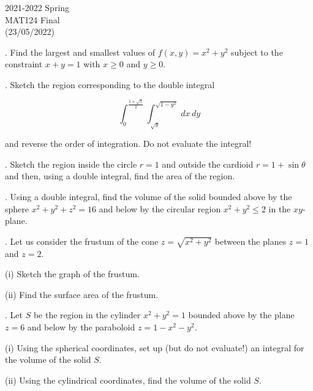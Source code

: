 \documentclass{article}
\begin{document}
\large

\begin{center}
2021-2022 Spring \\MAT124 Final\\(23/05/2022)
\end{center}

. Find the largest and smallest values of $f(x,y) = x^2+y^2$ subject to the constraint $x+y=1$ with $x\geq0$ and $y\geq0$.

\hfill

. Sketch the region corresponding to the double integral

\begin{equation*}
    \int_0^{\frac{1+\sqrt5}{2}}\int_{\sqrt{y}}^{\sqrt{1-y^2}}\,dx\,dy
\end{equation*}

\hfill

\noindent and reverse the order of integration. Do not evaluate the integral!

\hfill

. Sketch the region inside the circle $r=1$ and outside the cardioid $r=1+\sin\theta$ and then, using a double integral, find the area of the region.

\hfill

. Using a double integral, find the volume of the solid bounded above by the sphere $x^2+y^2+z^2 = 16$ and below by the circular region $x^2+y^2\leq2$ in the $xy$-plane.

\hfill

. Let us consider the frustum of the cone $z=\sqrt{x^2+y^2}$ between the planes $z=1$ and $z=2$.

\hfill

\noindent (i) Sketch the graph of the frustum.

\hfill

\noindent (ii) Find the surface area of the frustum.

\hfill

. Let $S$ be the region in the cylinder $x^2+y^2 = 1$ bounded above by the plane $z=6$ and below by the paraboloid $z=1-x^2-y^2$.

\hfill

\noindent (i) Using the spherical coordinates, set up (but do not evaluate!) an integral for the volume of the solid $S$.

\hfill

\noindent (ii) Using the cylindrical coordinates, find the volume of the solid $S$.
\end{document}
